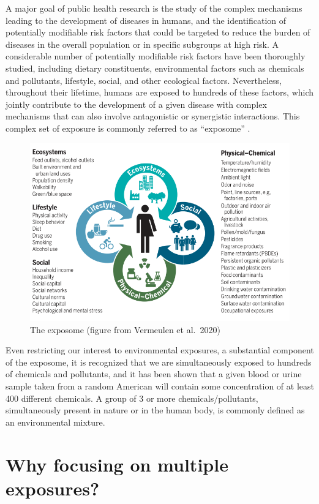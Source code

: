 \documentclass[
]{book}
\begin{document}
A major goal of public health research is the study of the complex mechanisms leading to the development of diseases in humans, and the identification of potentially modifiable risk factors that could be targeted to reduce the burden of diseases in the overall population or in specific subgroups at high risk. A considerable number of potentially modifiable risk factors have been thoroughly studied, including dietary constituents, environmental factors such as chemicals and pollutants, lifestyle, social, and other ecological factors. Nevertheless, throughout their lifetime, humans are exposed to hundreds of these factors, which jointly contribute to the development of a given disease with complex mechanisms that can also involve antagonistic or synergistic interactions. This complex set of exposure is commonly referred to as ``exposome'' \citep{vermeulen2020exposome}.

\begin{figure}
\centering
\includegraphics{images/exposome.png}
\caption{The exposome (figure from Vermeulen et al.~2020)}
\end{figure}

Even restricting our interest to environmental exposures, a substantial component of the exposome, it is recognized that we are simultaneously exposed to hundreds of chemicals and pollutants, and it has been shown that a given blood or urine sample taken from a random American will contain some concentration of at least 400 different chemicals. A group of 3 or more chemicals/pollutants, simultaneously present in nature or in the human body, is commonly defined as an environmental mixture.

\hypertarget{why-focusing-on-multiple-exposures}{%
\section{Why focusing on multiple exposures?}\label{why-focusing-on-multiple-exposures}}
\end{document}
